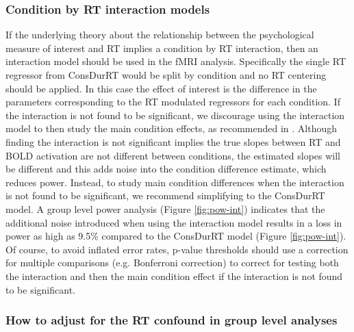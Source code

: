 \documentclass[titlepage,12pt] {article}
\begin{document}
\subsubsection*{Condition by RT interaction models}

If the underlying theory about the relationship between the psychological measure of interest and RT implies a condition by RT interaction, then an interaction model should be used in the fMRI analysis.  Specifically the single RT regressor from ConsDurRT would be split by condition and no RT centering should be applied.  In this case the effect of interest is the difference in the parameters corresponding to the RT modulated regressors for each condition.  If the interaction is not found to be significant, we discourage using the interaction model to then study the main condition effects, as recommended in \citet{carp_conditional_2010}.  Although finding the interaction is not significant implies the true slopes between RT and BOLD activation are not different between conditions, the estimated slopes will be different and this adds noise into the condition difference estimate, which reduces power.  Instead, to study main condition differences when the interaction is not found to be significant, we recommend simplifying to the ConsDurRT model.  A group level power analysis (Figure \ref{fig:pow-int}) indicates that the additional noise introduced when using the interaction model results in a loss in power as high as 9.5\% compared to the ConsDurRT model (Figure \ref{fig:pow-int}).  Of course, to avoid inflated error rates, p-value thresholds should use a correction for multiple comparisons (e.g. Bonferroni correction) to correct for testing both the interaction and then the main condition effect if the interaction is not found to be significant.

\subsubsection*{How to adjust for the RT confound in group level analyses}
\end{document}

